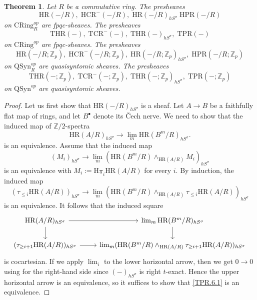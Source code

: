 \documentclass[10pt]{amsart}
\newtheorem{thm}{Theorem}[section]
\theoremstyle{definition}
\numberwithin{equation}{section}
\newcommand{\Z}{\mathbb{Z}}
\newcommand{\rH}{\mathrm{H}}
\newcommand{\ul}{\underline}
\newcommand{\CRing}{\mathrm{CRing}}
\newcommand{\QSyn}{\mathrm{QSyn}}
\newcommand{\HR}{\mathrm{HR}}
\newcommand{\HCR}{\mathrm{HCR}}
\newcommand{\HPR}{\mathrm{HPR}}
\newcommand{\TPR}{\mathrm{TPR}}
\newcommand{\THR}{\mathrm{THR}}
\newcommand{\TCR}{\mathrm{TCR}}
\begin{document}
{\begin{thm}
\label{TPR.6}
Let $R$ be a commutative ring.
The presheaves
\[
\HR(-/R),
\;
\HCR^-(-/R),
\;
\HR(-/R)_{hS^\sigma}
\;
\HPR(-/R)
\]
on $\CRing_R^{op}$ are fpqc-sheaves.
The presheaves
\[
\THR(-),
\;
\TCR^-(-),
\;
\THR(-)_{hS^\sigma},
\;
\TPR(-)
\]
on $\CRing^{op}$ are fpqc-sheaves.
The presheaves
\[
\HR(-/R;\Z_p),
\;
\HCR^-(-/R;\Z_p),
\;
\HR(-/R;\Z_p)_{hS^\sigma},
\;
\HPR(-/R;\Z_p)
\]
on $\QSyn_R^{op}$ are quasisyntomic sheaves.
The presheaves
\[
\THR(-;\Z_p),
\;
\TCR^-(-;\Z_p),
\;
\THR(-;\Z_p)_{hS^\sigma},
\;
\TPR(-;\Z_p)
\]
on $\QSyn^{op}$ are quasisyntomic sheaves.
\end{thm}
\begin{proof}
Let us first show that $\HR(-/R)_{h S^\sigma}$ is a sheaf.
Let $A\to B$ be a faithfully flat map of rings,
and let $B^\bullet$ denote its \v{C}ech nerve.
We need to show that the induced map of $\Z/2$-spectra
\[
\HR(A/R)_{hS^\sigma}
\to
\lim_m \HR(B^m/R)_{hS^\sigma}.
\]
is an equivalence.
Assume that the induced map
\begin{equation}
\label{TPR.6.1}
(M_i)_{hS^\sigma}
\to
\lim_m (\HR(B^m/R)\wedge_{\HR(A/R)}M_i)_{hS^\sigma}
\end{equation}
is an equivalence with $M_i:=\rH  \ul{\pi}_i \HR(A/R)$ for every $i$.
By induction,
the induced map
\[
(\tau_{\leq i} \HR(A/R))_{hS^\sigma}
\to
\lim_m (\HR(B^m/R)\wedge_{\HR(A/R)} \tau_{\leq i}\HR(A/R))_{hS^\sigma}
\]
is an equivalence.
It follows that the induced square
\[
\begin{tikzcd}
\HR(A/R)_{hS^\sigma}\ar[d]\ar[r]&
\lim_m \HR(B^m/R)_{hS^\sigma}\ar[d]
\\
(\tau_{\geq i+1} \HR(A/R))_{hS^\sigma}
\ar[r]&
\lim_m (\HR(B^m/R)\wedge_{\HR(A/R)} \tau_{\geq i+1}\HR(A/R))_{hS^\sigma}
\end{tikzcd}
\]
is cocartesian.
If we apply $\lim_i$ to the lower horizontal arrow,
then we get $0\to 0$ using \cite[Corollary 6.8.1]{BGS20} for the right-hand side since $(-)_{hS^\sigma}$ is right $t$-exact.
Hence the upper horizontal arrow is an equivalence,
so it suffices to show that \eqref{TPR.6.1} is an equivalence.


\end{proof}}
\end{document}
